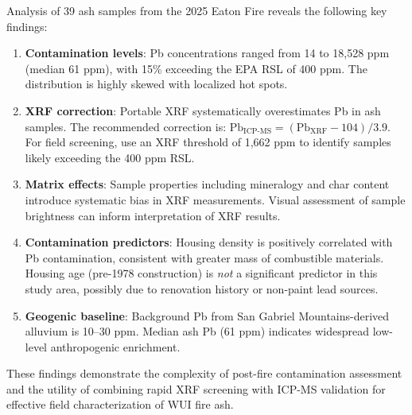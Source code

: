\documentclass[12pt,letterpaper]{article}
\begin{document}
Analysis of 39 ash samples from the 2025 Eaton Fire reveals the following key findings:

\begin{enumerate}
    \item \textbf{Contamination levels}: Pb concentrations ranged from 14 to 18,528 ppm (median 61 ppm), with 15\% exceeding the EPA RSL of 400 ppm. The distribution is highly skewed with localized hot spots.

    \item \textbf{XRF correction}: Portable XRF systematically overestimates Pb in ash samples. The recommended correction is: $\text{Pb}_{\text{ICP-MS}} = (\text{Pb}_{\text{XRF}} - 104) / 3.9$. For field screening, use an XRF threshold of 1,662 ppm to identify samples likely exceeding the 400 ppm RSL.

    \item \textbf{Matrix effects}: Sample properties including mineralogy and char content introduce systematic bias in XRF measurements. Visual assessment of sample brightness can inform interpretation of XRF results.

    \item \textbf{Contamination predictors}: Housing density is positively correlated with Pb contamination, consistent with greater mass of combustible materials. Housing age (pre-1978 construction) is \textit{not} a significant predictor in this study area, possibly due to renovation history or non-paint lead sources.

    \item \textbf{Geogenic baseline}: Background Pb from San Gabriel Mountains-derived alluvium is 10--30 ppm. Median ash Pb (61 ppm) indicates widespread low-level anthropogenic enrichment.
\end{enumerate}

These findings demonstrate the complexity of post-fire contamination assessment and the utility of combining rapid XRF screening with ICP-MS validation for effective field characterization of WUI fire ash.





\end{document}
